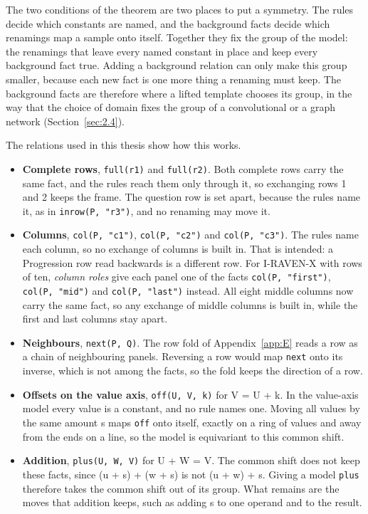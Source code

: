 The two conditions of the theorem are two places to put a symmetry. The rules decide which constants are named, and the background facts decide which renamings map a sample onto itself. Together they fix the group of the model: the renamings that leave every named constant in place and keep every background fact true. Adding a background relation can only make this group smaller, because each new fact is one more thing a renaming must keep. The background facts are therefore where a lifted template chooses its group, in the way that the choice of domain fixes the group of a convolutional or a graph network (Section~\ref{sec:2.4}).

The relations used in this thesis show how this works.

\begin{itemize}
\item \textbf{Complete rows}, \texttt{full(r1)} and \texttt{full(r2)}. Both complete rows carry the same fact, and the rules reach them only through it, so exchanging rows 1 and 2 keeps the frame. The question row is set apart, because the rules name it, as in \texttt{inrow(P, "r3")}, and no renaming may move it.
\item \textbf{Columns}, \texttt{col(P, "c1")}, \texttt{col(P, "c2")} and \texttt{col(P, "c3")}. The rules name each column, so no exchange of columns is built in. That is intended: a Progression row read backwards is a different row. For I-RAVEN-X with rows of ten, \emph{column roles} give each panel one of the facts \texttt{col(P, "first")}, \texttt{col(P, "mid")} and \texttt{col(P, "last")} instead. All eight middle columns now carry the same fact, so any exchange of middle columns is built in, while the first and last columns stay apart.
\item \textbf{Neighbours}, \texttt{next(P, Q)}. The row fold of Appendix~\ref{app:E} reads a row as a chain of neighbouring panels. Reversing a row would map \texttt{next} onto its inverse, which is not among the facts, so the fold keeps the direction of a row.
\item \textbf{Offsets on the value axis}, \texttt{off(U, V, k)} for V = U + k. In the value-axis model every value is a constant, and no rule names one. Moving all values by the same amount s maps \texttt{off} onto itself, exactly on a ring of values and away from the ends on a line, so the model is equivariant to this common shift.
\item \textbf{Addition}, \texttt{plus(U, W, V)} for U + W = V. The common shift does not keep these facts, since (u + s) + (w + s) is not (u + w) + s. Giving a model \texttt{plus} therefore takes the common shift out of its group. What remains are the moves that addition keeps, such as adding s to one operand and to the result.
\end{itemize}

